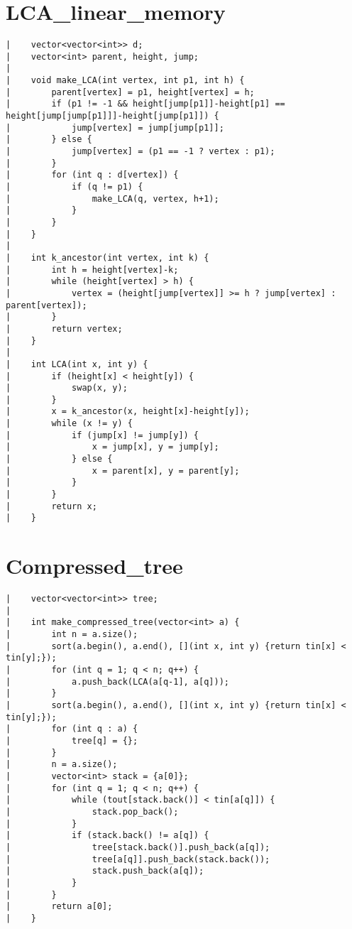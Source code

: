 \documentclass[a4paper, 10pt]{article}
\begin{document}
\begin{center}
\section*{LCA\_linear\_memory}
\begin{verbatim}
|    vector<vector<int>> d;
|    vector<int> parent, height, jump;
|    
|    void make_LCA(int vertex, int p1, int h) {
|        parent[vertex] = p1, height[vertex] = h;
|        if (p1 != -1 && height[jump[p1]]-height[p1] == height[jump[jump[p1]]]-height[jump[p1]]) {
|            jump[vertex] = jump[jump[p1]];
|        } else {
|            jump[vertex] = (p1 == -1 ? vertex : p1);
|        }
|        for (int q : d[vertex]) {
|            if (q != p1) {
|                make_LCA(q, vertex, h+1);
|            }
|        }
|    }
|    
|    int k_ancestor(int vertex, int k) {
|        int h = height[vertex]-k;
|        while (height[vertex] > h) {
|            vertex = (height[jump[vertex]] >= h ? jump[vertex] : parent[vertex]);
|        }
|        return vertex;
|    }
|    
|    int LCA(int x, int y) {
|        if (height[x] < height[y]) {
|            swap(x, y);
|        }
|        x = k_ancestor(x, height[x]-height[y]);
|        while (x != y) {
|            if (jump[x] != jump[y]) {
|                x = jump[x], y = jump[y];
|            } else {
|                x = parent[x], y = parent[y];
|            }
|        }
|        return x;
|    }
\end{verbatim}

\section*{Compressed\_tree}
\begin{verbatim}
|    vector<vector<int>> tree;
|    
|    int make_compressed_tree(vector<int> a) {
|        int n = a.size();
|        sort(a.begin(), a.end(), [](int x, int y) {return tin[x] < tin[y];});
|        for (int q = 1; q < n; q++) {
|            a.push_back(LCA(a[q-1], a[q]));
|        }
|        sort(a.begin(), a.end(), [](int x, int y) {return tin[x] < tin[y];});
|        for (int q : a) {
|            tree[q] = {};
|        }
|        n = a.size();
|        vector<int> stack = {a[0]};
|        for (int q = 1; q < n; q++) {
|            while (tout[stack.back()] < tin[a[q]]) {
|                stack.pop_back();
|            }
|            if (stack.back() != a[q]) {
|                tree[stack.back()].push_back(a[q]);
|                tree[a[q]].push_back(stack.back());
|                stack.push_back(a[q]);
|            }
|        }
|        return a[0];
|    }
\end{verbatim}


\end{center}
\end{document}
